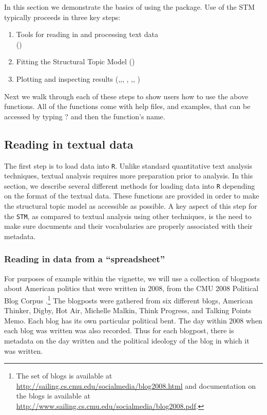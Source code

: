 \documentclass[nojss]{jss}
\begin{document}
In this section we demonstrate the basics of using the package. Use of the STM typically proceeds in three key steps:
\begin{enumerate}
\item Tools for reading in and processing text data \\
()
\item Fitting the Structural Topic Model
()
\item Plotting and inspecting results
(,,, , ,, )
\end{enumerate}

Next we walk through each of these steps to show users how to use the above functions. All of the functions come with help files, and examples, that can be accessed by typing ? and then the function's name.

\subsection{Reading in textual data}

The first step is to load data into \texttt{R}. Unlike standard quantitative text analysis techniques, textual analysis requires more preparation prior to analysis. In this section, we describe several different methods for loading data into \texttt{R} depending on the format of the textual data. These functions are provided in order to make the structural topic model as accessible as possible. A key aspect of this step for the \texttt{STM}, as compared to textual analysis using other techniques, is the need to make sure documents and their vocabularies are properly associated with their metadata.


\subsubsection{Reading in data from a ``spreadsheet''}

For purposes of example within the vignette, we will use a collection of blogposts about American politics that were written in 2008, from the CMU 2008 Political Blog Corpus \citep{poliblog}.\footnote{The set of blogs is available at \url{http://sailing.cs.cmu.edu/socialmedia/blog2008.html} and documentation on the blogs is available at \url{http://www.sailing.cs.cmu.edu/socialmedia/blog2008.pdf}.} The blogposts were gathered from six different blogs, American Thinker, Digby, Hot Air, Michelle Malkin, Think Progress, and Talking Points Memo.  Each blog has its own particular political bent.  The day within 2008 when each blog was written was also recorded.  Thus for each blogpost, there is metadata on the day written and the political ideology of the blog in which it was written.
\end{document}
